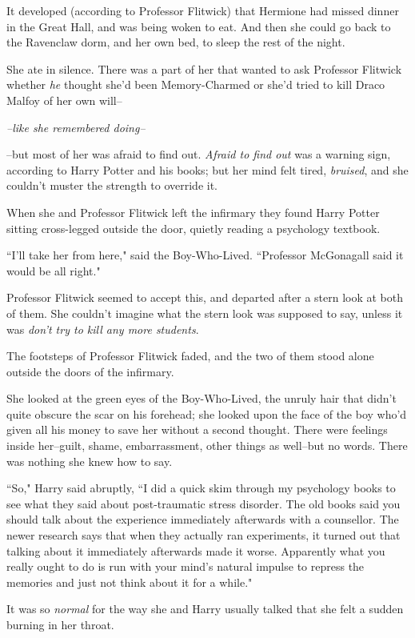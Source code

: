 It developed (according to Professor Flitwick) that Hermione had missed dinner in the Great Hall, and was being woken to eat. And then she could go back to the Ravenclaw dorm, and her own bed, to sleep the rest of the night.

She ate in silence. There was a part of her that wanted to ask Professor Flitwick whether \emph{he} thought she'd been Memory-Charmed or she'd tried to kill Draco Malfoy of her own will\---

\emph{\---like she remembered doing\---}

\---but most of her was afraid to find out. \emph{Afraid to find out} was a warning sign, according to Harry Potter and his books; but her mind felt tired, \emph{bruised}, and she couldn't muster the strength to override it.

When she and Professor Flitwick left the infirmary they found Harry Potter sitting cross-legged outside the door, quietly reading a psychology textbook.

``I'll take her from here," said the Boy-Who-Lived. ``Professor McGonagall said it would be all right."

Professor Flitwick seemed to accept this, and departed after a stern look at both of them. She couldn't imagine what the stern look was supposed to say, unless it was \emph{don't try to kill any more students}.

The footsteps of Professor Flitwick faded, and the two of them stood alone outside the doors of the infirmary.

She looked at the green eyes of the Boy-Who-Lived, the unruly hair that didn't quite obscure the scar on his forehead; she looked upon the face of the boy who'd given all his money to save her without a second thought. There were feelings inside her\---guilt, shame, embarrassment, other things as well\---but no words. There was nothing she knew how to say.

``So," Harry said abruptly, ``I did a quick skim through my psychology books to see what they said about post-traumatic stress disorder. The old books said you should talk about the experience immediately afterwards with a counsellor. The newer research says that when they actually ran experiments, it turned out that talking about it immediately afterwards made it worse. Apparently what you really ought to do is run with your mind's natural impulse to repress the memories and just not think about it for a while."

It was so \emph{normal} for the way she and Harry usually talked that she felt a sudden burning in her throat.

